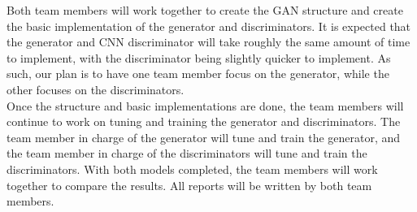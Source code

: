 \documentclass[11pt, letterpaper]{article}
\begin{document}
Both team members will work together to create the GAN structure and create the basic implementation of the generator and discriminators. It is expected that the generator and CNN discriminator will take roughly the same amount of time to implement, with the discriminator being slightly quicker to implement. As such, our plan is to have one team member focus on the generator, while the other focuses on the discriminators. \\

Once the structure and basic implementations are done, the team members will continue to work on tuning and training the generator and discriminators. The team member in charge of the generator will tune and train the generator, and the team member in charge of the discriminators will tune and train the discriminators. With both models completed, the team members will work together to compare the results. All reports will be written by both team members.
\end{document}
